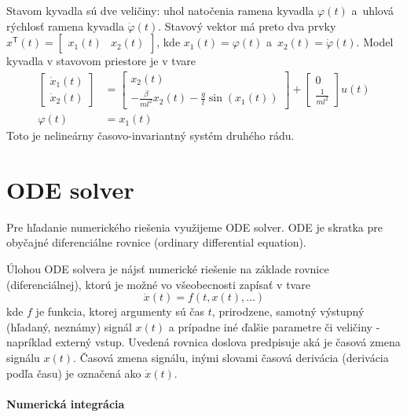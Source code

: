 \documentclass[a4paper, 10pt, ]{article}
\begin{document}
Stavom kyvadla sú dve veličiny: uhol natočenia ramena kyvadla $\varphi(t)$ a~uhlová rýchlosť ramena kyvadla $\dot\varphi(t)$. Stavový vektor má preto dva prvky $x^{\mathsf{T}}(t) = \begin{bmatrix} x_1(t) & x_2(t)	\end{bmatrix}$, kde $x_1(t) = \varphi(t)$ a~$x_2(t) = \dot\varphi(t)$. Model kyvadla v stavovom priestore je v tvare
\begin{subequations}
	\begin{align}
		\begin{bmatrix}
			\dot{x}_1(t) \\ \dot{x}_2(t)
		\end{bmatrix}
		&=
		\begin{bmatrix}
			x_2(t) \\ - \frac{\beta}{ml^2} x_2(t) - \frac{g}{l} \sin(x_1(t))
		\end{bmatrix}
		+
		\begin{bmatrix}
			0 \\ \frac{1}{ml^2}
		\end{bmatrix}
		u(t) \\
		\varphi(t) &= x_1(t)
	\end{align}
\end{subequations}
Toto je nelineárny časovo-invariantný systém druhého rádu.





\section{ODE solver}


Pre hľadanie numerického riešenia využijeme ODE solver. ODE je skratka pre obyčajné diferenciálne rovnice (ordinary differential equation).

Úlohou ODE solvera je nájsť numerické riešenie na základe rovnice (diferenciálnej), ktorú je možné vo všeobecnosti zapísať v tvare
\begin{equation}
    \dot x(t) = f \left( t, x(t), \ldots \right)
\end{equation}
kde $f$ je funkcia, ktorej argumenty sú čas $t$, prirodzene, samotný výstupný (hľadaný, neznámy) signál $x(t)$ a prípadne iné ďalšie parametre či veličiny - napríklad externý vstup. Uvedená rovnica doslova predpisuje aká je časová zmena signálu $x(t)$. Časová zmena signálu, inými slovami časová derivácia (derivácia podľa času) je označená ako $\dot x(t)$.


\paragraph{Numerická integrácia}
\end{document}
